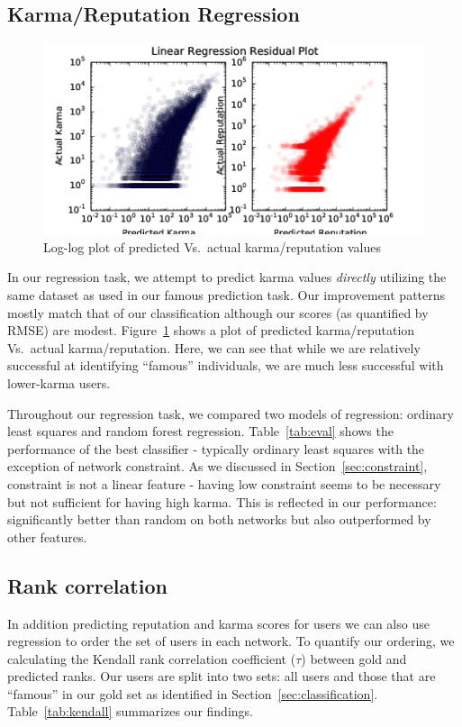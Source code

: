 \documentclass[11pt]{article}
\begin{document}
\subsection{Karma/Reputation Regression}
\label{sec:regression}
\begin{figure}[h]
\centering
\includegraphics[width=\linewidth]{residuals-png}
\caption{Log-log plot of predicted Vs.\ actual karma/reputation values}
\label{fig:residuals}
\end{figure}

In our regression task, we attempt to predict karma values \textit{directly}
utilizing the same dataset as used in our famous prediction task. Our
improvement patterns mostly match that of our classification although our scores
(as quantified by RMSE) are modest. Figure~\ref{fig:residuals} shows a plot
of predicted karma/reputation Vs.\ actual karma/reputation. Here, we can see that
while we are relatively successful at identifying ``famous'' individuals, we are
much less successful with lower-karma users.

Throughout our regression task, we compared two models of regression: ordinary least
squares  and random forest regression. Table~\ref{tab:eval} shows the performance of 
the best classifier - typically ordinary least squares with the exception of network
constraint. As we discussed in Section~\ref{sec:constraint}, constraint is not
a linear feature - having low constraint seems to be necessary but not sufficient
for having high karma. This is reflected in our performance: significantly better
than random on both networks but also outperformed by other features.

\subsection{Rank correlation}

In addition predicting reputation and karma scores for users we can also
use regression to order the set of users in each network. To quantify
our ordering, we calculating the Kendall rank correlation 
coefficient ($\tau$) between gold and predicted ranks. Our users are split into two sets:
all users and those that are ``famous'' in our gold set as identified in 
Section~\ref{sec:classification}. Table~\ref{tab:kendall} summarizes our findings.
\end{document}
